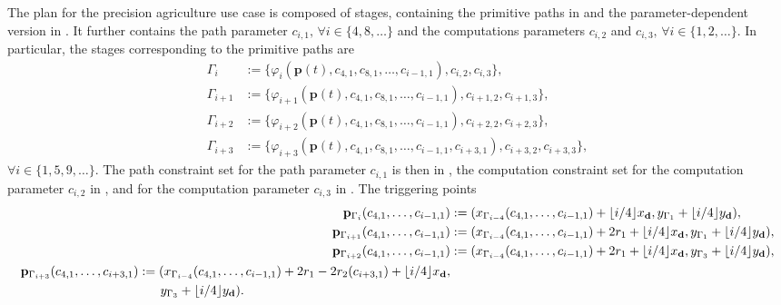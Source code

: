 The plan for the precision agriculture use case is composed of stages, containing the primitive paths in  and the parameter-dependent version in . It further contains the path parameter $c_{i,1},\,\forall i\in\{4,8,\dots\}$ and the computations parameters $c_{i,2}$ and $c_{i,3},\,\forall i\in\{1,2,\dots\}$. In particular, the stages corresponding to the primitive paths are 
\begin{subequations}\label{eq:ex-pb-stages}\begin{align}
  \Gamma_i&:=\{\varphi_i(\mathbf{p}(t),c_{4,1},c_{8,1},\dots,c_{i-1,1}),c_{i,2},c_{i,3}\},\label{eq:line-plan}\\
  \Gamma_{i+1}&:=\{\varphi_{i+1}(\mathbf{p}(t),c_{4,1},c_{8,1},\dots,c_{i-1,1}),c_{i+1,2},c_{i+1,3}\},\label{eq:circ-plan}\\
  \Gamma_{i+2}&:=\{\varphi_{i+2}(\mathbf{p}(t),c_{4,1},c_{8,1},\dots,c_{i-1,1}),c_{i+2,2},c_{i+2,3}\},\label{eq:line2-plan}\\
  \Gamma_{i+3}&:=\{\varphi_{i+3}(\mathbf{p}(t),c_{4,1},c_{8,1},\dots,c_{i-1,1},c_{i+3,1}),c_{i+3,2},c_{i+3,3}\},\label{eq:circ2-plan}
\end{align}
\end{subequations}
$\forall i\in\{1,5,9,\dots\}$. The path constraint set for the path parameter $c_{i,1}$ is then in , the computation constraint set for the computation parameter $c_{i,2}$ in , and for the computation parameter $c_{i,3}$ in . The triggering points
\begin{subequations}\label{eq:ex-pb-trigs}\begin{align}
  \mathbf{p}_{\Gamma_i}(c_{4,1},\dots,c_{i-1,1})&:=(x_{\Gamma_{i-4}}(c_{4,1},\dots,c_{i-1,1})+\lfloor i/4\rfloor x_\mathbf{d},y_{\Gamma_1}+\lfloor i/4\rfloor y_\mathbf{d}),\\
  \mathbf{p}_{\Gamma_{i+1}}(c_{4,1},\dots,c_{i-1,1})&:=(x_{\Gamma_{i-4}}(c_{4,1},\dots,c_{i-1,1})+2r_1+\lfloor i/4\rfloor x_\mathbf{d},y_{\Gamma_1}+\lfloor i/4\rfloor y_\mathbf{d}),\hspace*{-1ex}\\
  \mathbf{p}_{\Gamma_{i+2}}(c_{4,1},\dots,c_{i-1,1})&:=(x_{\Gamma_{i-4}}(c_{4,1},\dots,c_{i-1,1})+2r_1+\lfloor i/4\rfloor x_\mathbf{d},y_{\Gamma_3}+\lfloor i/4\rfloor y_\mathbf{d}),\\
  \begin{split}
  \mathbf{p}_{\Gamma_{i+3}}(c_{4,1},\dots,c_{i+3,1})&:=(x_{\Gamma_{i-4}}(c_{4,1},\dots,c_{i-1,1})+2r_1-2r_2(c_{i+3,1})+\lfloor i/4\rfloor x_\mathbf{d},\\
  &\hspace*{4ex}y_{\Gamma_3}+\lfloor i/4\rfloor y_\mathbf{d}).\end{split}
\end{align}
\end{subequations}
